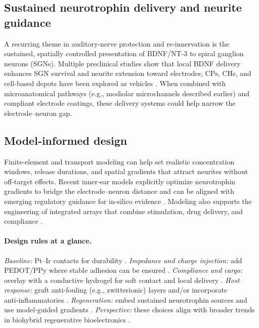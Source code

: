 \subsection{Sustained neurotrophin delivery and neurite guidance}
A recurring theme in auditory‑nerve protection and re‑innervation is the sustained, spatially controlled presentation of BDNF/NT‑3 to spiral ganglion neurons (SGNs). Multiple preclinical studies show that local BDNF delivery enhances SGN survival and neurite extension toward electrodes; CPs, CHs, and cell‑based depots have been explored as vehicles \cite{Evans2009-cm,Chikar2012,Leake2013,Scheper2019}. When combined with microanatomical pathways (e.g., modiolar microchannels described earlier) and compliant electrode coatings, these delivery systems could help narrow the electrode–neuron gap.

\subsection{Model‑informed design}
Finite‑element and transport modeling can help set realistic concentration windows, release durations, and spatial gradients that attract neurites without off‑target effects. Recent inner‑ear models explicitly optimize neurotrophin gradients to bridge the electrode–neuron distance and can be aligned with emerging regulatory guidance for in‑silico evidence \cite{Nella2022NeurotrophinGradients,Zhang2023CFD,USFDA2021InSilico}. Modeling also supports the engineering of integrated arrays that combine stimulation, drug delivery, and compliance \cite{Borenstein2011,Lenarz2020FirstHuman}.

\paragraph{Design rules at a glance.}
\emph{Baseline:} Pt–Ir contacts for durability \cite{Shepherd2020,Dalrymple2020_ptir}. 
\emph{Impedance and charge injection:} add PEDOT/PPy where stable adhesion can be ensured \cite{Venkatraman2011-ql,li2025pedot,Chhin2018}. 
\emph{Compliance and cargo:} overlay with a conductive hydrogel for soft contact and local delivery \cite{Green2012,Hassarati2014,Dalrymple2020}. 
\emph{Host response:} graft anti‑fouling (e.g., zwitterionic) layers and/or incorporate anti‑inflammatories \cite{Horne2023,Kiefer2008Dexameth,Briggs2020}. 
\emph{Regeneration:} embed sustained neurotrophin sources and use model‑guided gradients \cite{Evans2009-cm,Leake2013,Nella2022NeurotrophinGradients}. 
\emph{Perspective:} these choices align with broader trends in biohybrid regenerative bioelectronics \cite{CarnicerLombarte2024AdvMat,Hergenreder2024NatBiotech}.
